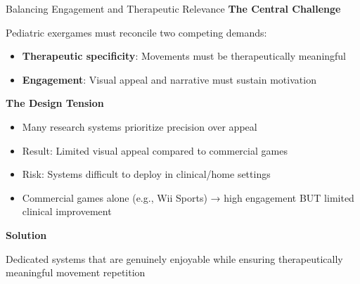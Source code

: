 \begin{frame}{Balancing Engagement and Therapeutic Relevance}
	\textbf{\textcolor{gbAqua}{The Central Challenge}}
	
	Pediatric exergames must reconcile two competing demands:
	
	\begin{itemize}
		\item \textbf{Therapeutic specificity}: Movements must be therapeutically meaningful
		\item \textbf{Engagement}: Visual appeal and narrative must sustain motivation
	\end{itemize}
	
	\vspace{0.3cm}
	
	\textbf{\textcolor{gbAqua}{The Design Tension}}
	
	\begin{itemize}
		\item Many research systems prioritize precision over appeal
		\item Result: Limited visual appeal compared to commercial games
		\item Risk: Systems difficult to deploy in clinical/home settings
		\item Commercial games alone (e.g., Wii Sports) → high engagement BUT limited clinical improvement
	\end{itemize}
	
	\vspace{0.3cm}
	
	\textbf{\textcolor{gbAqua}{Solution}}
	
	Dedicated systems that are genuinely enjoyable while ensuring therapeutically meaningful movement repetition
	
\end{frame}

